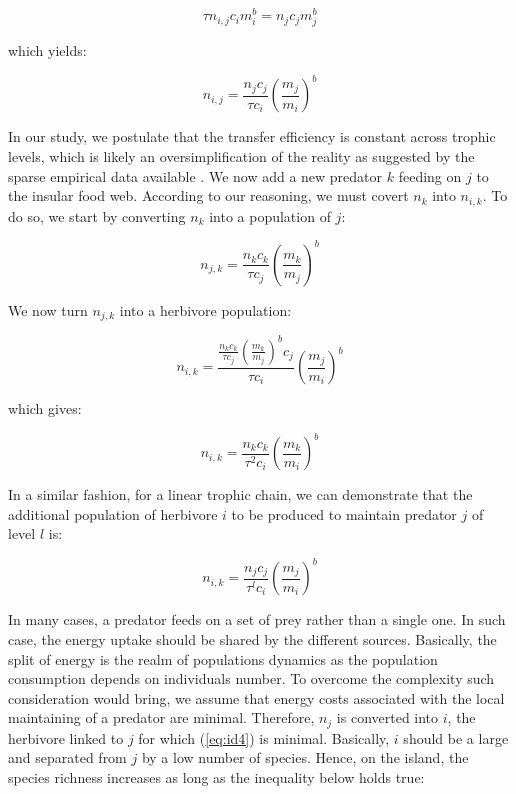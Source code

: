 \begin{equation} \tau n_{i,j} c_im_i^b = n_jc_jm_j^b \label{eq:id1}\end{equation}

which yields:

\begin{equation} n_{i,j} = \frac{n_jc_j}{\tau c_i} \left( \frac{m_j}{m_i} \right)^b \label{eq:id2}\end{equation}

In our study, we postulate that the transfer efficiency is constant
across trophic levels, which is likely an oversimplification of the
reality as suggested by the sparse empirical data available
\citep{Trebilco2013, Brown2003}. We now add a new predator \(k\) feeding
on \(j\) to the insular food web. According to our reasoning, we must
covert \(n_k\) into \(n_{i,k}\). To do so, we start by converting
\(n_k\) into a population of \(j\):

\begin{equation} n_{j,k} = \frac{n_kc_k}{\tau c_j} \left( \frac{m_k}{m_j} \right)^b \label{eq:id2}\end{equation}

We now turn \(n_{j,k}\) into a herbivore population:

\begin{equation} n_{i,k} = \frac{\frac{n_kc_k}{\tau c_j} \left( \frac{m_k}{m_j} \right)^bc_j}{\tau c_i} \left( \frac{m_j}{m_i} \right)^b \label{eq:id3}\end{equation}

which gives:

\begin{equation} n_{i,k} = \frac{n_kc_k}{\tau^2 c_i} \left( \frac{m_k}{m_i} \right)^b \label{eq:id3b}\end{equation}

In a similar fashion, for a linear trophic chain, we can demonstrate
that the additional population of herbivore \(i\) to be produced to
maintain predator \(j\) of level \(l\) is:

\begin{equation} n_{i,k} = \frac{n_jc_j}{\tau^l c_i} \left( \frac{m_j}{m_i} \right)^b \label{eq:id4}\end{equation}

In many cases, a predator feeds on a set of prey rather than a single
one. In such case, the energy uptake should be shared by the different
sources. Basically, the split of energy is the realm of populations
dynamics as the population consumption depends on individuals number. To
overcome the complexity such consideration would bring, we assume that
energy costs associated with the local maintaining of a predator are
minimal. Therefore, \(n_j\) is converted into \(i\), the herbivore
linked to \(j\) for which (\ref{eq:id4}) is minimal. Basically, \(i\)
should be a large and separated from \(j\) by a low number of species.
Hence, on the island, the species richness increases as long as the
inequality below holds true:

